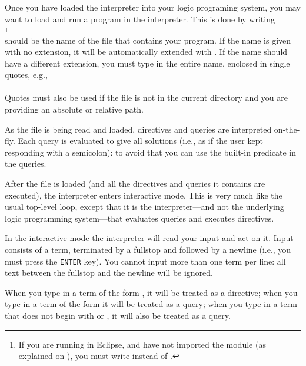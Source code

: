 Once you have loaded the interpreter into your logic programing system, you
may want to load and run a program in the interpreter. This is done by
writing\\
\ind{}%
\footnote{
  If you are running in Eclipse, and have not imported the module 
  (as explained on ), you must write 
  instead of .
}\\
 should be the name of the file that contains your program.
If the name is given with no extension, it will be automatically extended
with .%
%
If the name should have a different extension, you must type in the entire
name, enclosed in single quotes, e.g.,\\
\ind{}\\
Quotes must also be used if the file is not in the current directory and you
are providing an absolute or relative path.

As the file is being read and loaded, directives and queries are interpreted
on-the-fly. Each query is evaluated to give all solutions (i.e., as if the
user kept responding with a semicolon): to avoid that you can use the
built-in predicate  in the queries.



After the file is loaded (and all the directives and queries it contains are
executed), the interpreter enters interactive mode.  This is very much like
the usual top-level loop, except that it is the interpreter---and not the
underlying logic programming system---that evaluates queries and executes
directives.

In the interactive mode the interpreter will read your input and act on it.
Input consists of a term, terminated by a fullstop and followed by a newline
(i.e., you must press the \texttt{ENTER} key). You cannot input more than one
term per line: all text between the fullstop and the newline will be ignored.

When you type in a term of the form , it will be treated
as a directive; when you type in a term of the form  it
will be treated as a query; when you type in a term that does not begin with
\prog{:-} or , it will also be treated as a query.

